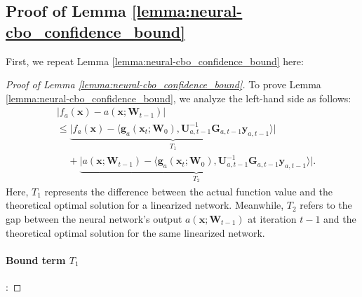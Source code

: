 \subsection{Proof of Lemma \ref{lemma:neural-cbo_confidence_bound}}
First, we repeat Lemma \ref{lemma:neural-cbo_confidence_bound} here:
\NeuralCBOConfidenceBound*

\begin{proof}[Proof of Lemma \ref{lemma:neural-cbo_confidence_bound}]
To prove Lemma \ref{lemma:neural-cbo_confidence_bound}, we analyze the left-hand side as follows:
\begin{align*}
    & \lvert f_a(\mathbf{x}) - a(\mathbf{x}; \mathbf{W}_{t-1}) \rvert 
    \\
    & \le \underbrace{\lvert f_a(\mathbf{x}) - \langle \mathbf{g}_a(\mathbf{x}_{t};\mathbf{W}_{0}),\mathbf{U}_{a,t-1}^{-1}\mathbf{G}_{a,t-1}\mathbf{y}_{a,t-1} \rangle  \rvert}_{T_1} \\
    & \;\;\; \; + \underbrace{\lvert a(\mathbf{x}; \mathbf{W}_{t-1}) - \langle \mathbf{g}_a(\mathbf{x}_{t};\mathbf{W}_{0}),\mathbf{U}_{a,t-1}^{-1}\mathbf{G}_{a,t-1}\mathbf{y}_{a,t-1} \rangle  \rvert}_{T_2}.
\end{align*}
Here, $T_1$ represents the difference between the actual function value and the theoretical optimal solution for a linearized network. Meanwhile, $T_2$ refers to the gap between the neural network's output $a(\mathbf{x}; \boldsymbol{W}_{t-1})$ at iteration $t-1$ and the theoretical optimal solution for the same linearized network.
\paragraph{Bound term $T_1$}:


\end{proof}
